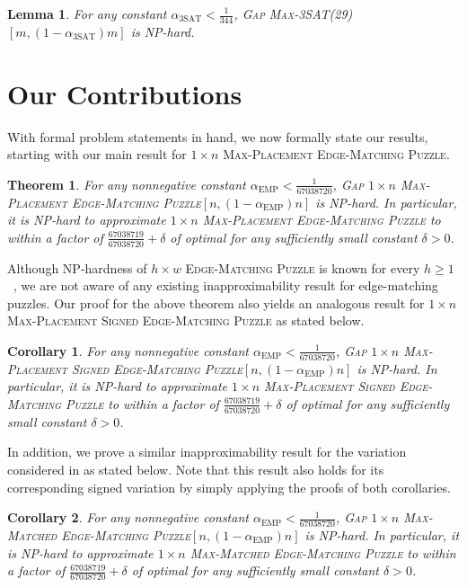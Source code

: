 \documentclass[11pt]{article}
\newtheorem{theorem}{Theorem}
\newtheorem{lemma}{Lemma}
\newtheorem{corollary}{Corollary}
\def\SAT{\mathrm{3SAT}}
\def\EMP{\mathrm{EMP}}
\def\Gap#1{\textsc{Gap} #1}
\begin{document}
\begin{lemma} \label{lem-3sat-approx}
For any constant $\alpha_{\SAT} < \frac{1}{344}$, \Gap{\textsc{Max-3SAT(29)}}$[m, (1-\alpha_{\SAT})m]$ is NP-hard.
\end{lemma}

\section{Our Contributions}

With formal problem statements in hand, we now formally state our results, starting with our main result for \textsc{$1 \times n$ Max-Placement Edge-Matching Puzzle}.

\begin{theorem} \label{thm:main}
For any nonnegative constant $\alpha_{\EMP} < \frac{1}{67038720}$, \Gap{\textsc{$1 \times n$ Max-Placement Edge-Matching Puzzle}}$[n, (1-\alpha_{\EMP})n]$ is NP-hard. In particular, it is NP-hard to approximate \textsc{$1 \times n$ Max-Placement Edge-Matching Puzzle} to within a factor of $\frac{67038719}{67038720}  + \delta$ of optimal for any sufficiently small constant $\delta > 0$.
\end{theorem}

Although NP-hardness of \textsc{$h \times w$ Edge-Matching Puzzle} is known for every $h \geq 1$~\cite{EFW11}, we are not aware of any existing inapproximability result for edge-matching puzzles. Our proof for the above theorem also yields an analogous result for \textsc{$1 \times n$ Max-Placement Signed Edge-Matching Puzzle} as stated below.

\begin{corollary} \label{cor:signed}
For any nonnegative constant $\alpha_{\EMP} < \frac{1}{67038720}$, \Gap{\textsc{$1 \times n$ Max-Placement Signed Edge-Matching Puzzle}}$[n, (1-\alpha_{\EMP})n]$ is NP-hard. In particular, it is NP-hard to approximate \textsc{$1 \times n$ Max-Placement Signed Edge-Matching Puzzle} to within a factor of $\frac{67038719}{67038720}  + \delta$ of optimal for any sufficiently small constant $\delta > 0$.
\end{corollary}

In addition, we prove a similar inapproximability result for the variation considered in \cite{Antoniadis-Lingas-2010} as stated below. Note that this result also holds for its corresponding signed variation by simply applying the proofs of both corollaries.

\begin{corollary} \label{cor:mme}
For any nonnegative constant $\alpha_{\EMP} < \frac{1}{67038720}$, \Gap{\textsc{$1 \times n$ Max-Matched Edge-Matching Puzzle}}$[n, (1-\alpha_{\EMP})n]$ is NP-hard. In particular, it is NP-hard to approximate \textsc{$1 \times n$ Max-Matched Edge-Matching Puzzle} to within a factor of $\frac{67038719}{67038720}  + \delta$ of optimal for any sufficiently small constant $\delta > 0$.
\end{corollary}
\end{document}

